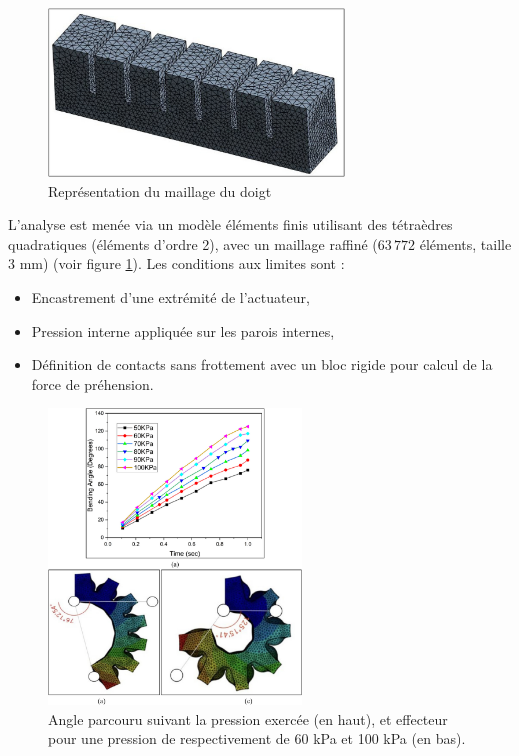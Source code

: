 \documentclass[a4paper, 11pt]{report}
\begin{document}
            \begin{figure}
                \centering
                \includegraphics[width=0.7\textwidth]{Figures/doigt_finit_elements.jpg}
                \caption{Représentation du maillage du doigt \cite{bhat_numerical_2025}}
                \label{fig:doigt_finit_elements}
            \end{figure}

            L’analyse est menée via un modèle éléments finis utilisant des tétraèdres quadratiques (éléments d'ordre 2), avec un maillage raffiné (\( 63\,772 \) éléments, taille 3 mm) (voir figure \ref{fig:doigt_finit_elements}). Les conditions aux limites sont :
            \begin{itemize}
            \item Encastrement d’une extrémité de l’actuateur,
            \item Pression interne appliquée sur les parois internes,
            \item Définition de contacts sans frottement avec un bloc rigide pour calcul de la force de préhension.
            \end{itemize}

            \begin{figure}
                \centering
                \includegraphics[width=0.6\textwidth]{Figures/angle_pression.jpg}
                \caption{Angle parcouru suivant la pression exercée (en haut), et effecteur pour une pression de respectivement de 60 kPa et 100 kPa (en bas).\cite{bhat_numerical_2025}}
                \label{fig:angle_pression}
            \end{figure}
\end{document}
